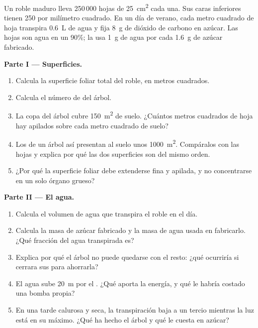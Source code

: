 \begin{problem}
\label{pb:g12:plant-rooted-life:1}
Un roble maduro lleva 250\,000 hojas de \qty{25}{cm^2} cada una. Sus
caras inferiores tienen 250  por milímetro cuadrado. En un día
de verano, cada metro cuadrado de hoja transpira \qty{0.6}{L} de agua y
fija \qty{8}{g} de dióxido de carbono en azúcar. Las hojas son agua en
un 90\%; la  usa \qty{1}{g} de agua por cada \qty{1.6}{g}
de azúcar fabricado.

\medskip
\noindent\textbf{Parte I --- Superficies.}
\begin{enumerate}
  \item Calcula la superficie foliar total del roble, en metros
        cuadrados.
  \item Calcula el número de  del árbol.
  \item La copa del árbol cubre \qty{150}{m^2} de suelo. ¿Cuántos
        metros cuadrados de hoja hay apilados sobre cada metro cuadrado
        de suelo?
  \item Los  de un árbol así presentan al suelo unos
        \qty{1000}{m^2}. Compáralos con las hojas y explica por qué las
        dos superficies son del mismo orden.
  \item ¿Por qué la superficie foliar debe extenderse fina y apilada, y
        no concentrarse en un solo órgano grueso?
\end{enumerate}

\medskip
\noindent\textbf{Parte II --- El agua.}
\begin{enumerate}[resume]
  \item Calcula el volumen de agua que transpira el roble en el día.
  \item Calcula la masa de azúcar fabricado y la masa de agua usada en
        fabricarlo. ¿Qué fracción del agua transpirada es?
  \item Explica por qué el árbol no puede quedarse con el resto: ¿qué
        ocurriría si cerrara sus  para ahorrarla?
  \item El agua sube \qty{20}{m} por el . ¿Qué aporta la energía,
        y qué le habría costado una bomba propia?
  \item En una tarde calurosa y seca, la transpiración baja a un tercio
        mientras la luz está en su máximo. ¿Qué ha hecho el árbol y qué
        le cuesta en azúcar?
\end{enumerate}


\end{problem}
